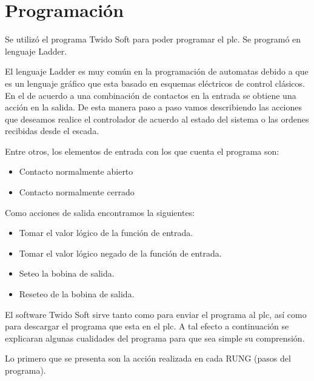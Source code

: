 \section{Programación}
\label{sec:Programacion}
Se utilizó el programa Twido Soft para poder programar el \gls{plc}. Se programó
en lenguaje Ladder.

El lenguaje Ladder es muy común en la programación de automatas debido a que es un 
lenguaje gráfico que esta basado en esquemas eléctricos de control clásicos. En el
de acuerdo a una combinación de contactos en la entrada se obtiene una acción en la
salida. De esta manera paso a paso vamos describiendo las acciones que deseamos
realice el controlador de acuerdo al estado del sistema o las ordenes recibidas desde
el escada.

Entre otros, los elementos de entrada con los que cuenta el programa son:

 \begin{itemize}
  \item Contacto normalmente abierto
  \item Contacto normalmente cerrado
 \end{itemize}
 
Como acciones de salida encontramos la siguientes:

  \begin{itemize}
   \item Tomar el valor lógico de la función de entrada.
   \item Tomar el valor lógico negado de la función de entrada.
   \item Seteo la bobina de salida.
   \item Reseteo de la bobina de salida.
  \end{itemize}

El software Twido Soft sirve tanto como para enviar el programa al \gls{plc}, así como 
para descargar el programa que esta en el \gls{plc}. A tal efecto a continuación 
se explicaran algunas cualidades del programa para que sea simple su comprensión.

Lo primero que se presenta son la acción realizada en cada RUNG (pasos del programa).


